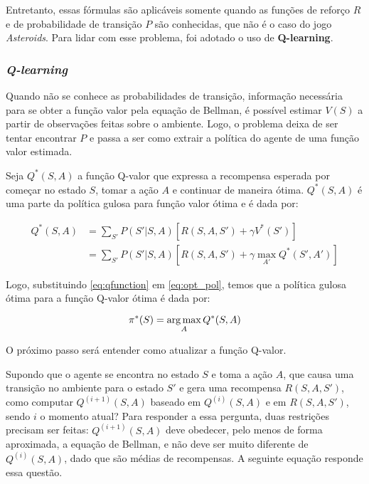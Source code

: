 Entretanto, essas fórmulas são aplicáveis somente quando as funções de reforço $R$ e de probabilidade de transição $P$ são conhecidas, que não é o caso do jogo \textit{Asteroids}. Para lidar com esse problema, foi adotado o uso de \textbf{Q-learning}.

\subsubsection{\textit{Q-learning}}
\label{sec:ql}

Quando não se conhece as probabilidades de transição, informação necessária para se obter a função valor pela equação de Bellman, é possível estimar $V(S)$ a partir de observações feitas sobre o ambiente. Logo, o problema deixa de ser tentar encontrar $P$ e passa a ser como extrair a política do agente de uma função valor estimada.

Seja $Q^{*}(S,A)$ a função Q-valor que expressa a recompensa esperada por começar no estado $S$, tomar a ação $A$ e continuar de maneira ótima. $Q^{*}(S,A)$ é uma parte da política gulosa para função valor ótima e é dada por:

\begin{equation} \label{eq:qfunction}
\begin{align*}
Q^{*}(S,A) &= \sum_{S'}P(S'|S,A)[R(S,A,S') + \gamma V^{*}(S')] \\
        &= \sum_{S'}P(S'|S,A)[R(S,A,S') + \gamma \max_{A'}Q^{*}(S',A')]
\end{align*}
\end{equation}

Logo, substituindo \ref{eq:qfunction} em \ref{eq:opt_pol}, temos que a política gulosa ótima para a função Q-valor ótima é dada por:

\begin{equation} \label{eq:q_opt_pol}
\pi^{*}(S) = \operatorname*{arg\,max}_{A}Q^{*}(S,A)
\end{equation}

O próximo passo será entender como atualizar a função Q-valor.

Supondo que o agente se encontra no estado $S$ e toma a ação $A$, que causa uma transição no ambiente para o estado $S'$ e gera uma recompensa $R(S,A,S')$, como computar $Q^{(i+1)}(S,A)$ baseado em $Q^{(i)}(S,A)$ e em $R(S,A,S')$, sendo $i$ o momento atual? Para responder a essa pergunta, duas restrições precisam ser feitas: $Q^{(i+1)}(S,A)$ deve obedecer, pelo menos de forma aproximada, a equação de Bellman, e não deve ser muito diferente de $Q^{(i)}(S,A)$, dado que são médias de recompensas. A seguinte equação responde essa questão.

